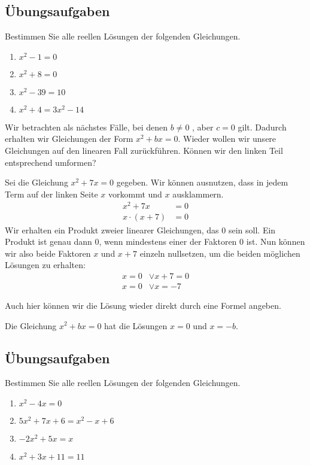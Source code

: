 \documentclass[../../main.tex]{subfiles}
\begin{document}
\subsection*{Übungsaufgaben}
Bestimmen Sie alle reellen Lösungen der folgenden Gleichungen.
\begin{enumerate}
    \item $x^2-1=0$
    \item $x^2+8=0$
    \item $x^2-39=10$
    \item $x^2+4=3x^2-14$
\end{enumerate}
\noindent Wir betrachten als nächstes Fälle, bei denen $b\neq0$ , aber $c=0$ gilt. Dadurch erhalten wir Gleichungen der Form $x^2+bx=0$. Wieder wollen wir unsere Gleichungen auf den linearen Fall zurückführen. Können wir den linken Teil entsprechend umformen?
\begin{example}
Sei die Gleichung $x^2+7x=0$ gegeben. Wir können ausnutzen, dass in jedem Term auf der linken Seite $x$ vorkommt und $x$ ausklammern.
\begin{equation*}\begin{split}
    x^2+7x&=0\\
    x\cdot(x+7)&=0
\end{split}\end{equation*}
Wir erhalten ein Produkt zweier linearer Gleichungen, das $0$ sein soll. Ein Produkt ist genau dann $0$, wenn mindestens einer der Faktoren $0$ ist. Nun können wir also beide Faktoren $x$ und $x+7$ einzeln nullsetzen, um die beiden möglichen Lösungen zu erhalten:
\begin{equation*}\begin{split}
x=0&\lor x+7=0\\
x=0&\lor x=-7
\end{split}\end{equation*}
\end{example}
\noindent Auch hier können wir die Lösung wieder direkt durch eine Formel angeben.
\begin{theorem}
Die Gleichung $x^2+bx=0$ hat die Lösungen $x=0$ und $x=-b$.
\end{theorem}
\subsection*{Übungsaufgaben}
Bestimmen Sie alle reellen Lösungen der folgenden Gleichungen.
\begin{enumerate}
    \item $x^2-4x=0$
    \item $5x^2+7x+6=x^2-x+6$
    \item $-2x^2+5x=x$
    \item $x^2+3x+11=11$
\end{enumerate}
\end{document}
